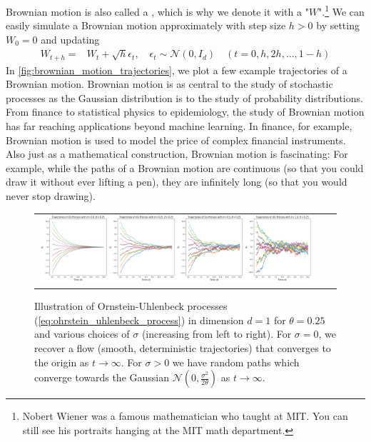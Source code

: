 Brownian motion is also called a , which is why we denote it with a "$W$".\footnote{Nobert Wiener was a famous mathematician who taught at MIT. You can still see his portraits hanging at the MIT math department.} We can easily simulate a Brownian motion approximately with step size $h>0$ by setting $W_0=0$ and updating
\begin{align}
    \label{eq:brownian_motion_simulation}
    W_{t+h} =& W_{t} + \sqrt{h}\epsilon_t,\quad \epsilon_t\sim\mathcal{N}(0,I_d)\quad (t=0,h,2h,\dots,1-h)
\end{align}
In \cref{fig:brownian_motion_trajectories}, we plot a few example trajectories of a Brownian motion.  Brownian motion is as central to the study of stochastic processes as the Gaussian distribution is to the study of probability distributions. From finance to statistical physics to epidemiology, the study of Brownian motion has far reaching applications beyond  machine learning. In finance, for example, Brownian motion is used to model the price of complex financial instruments. Also just as a mathematical construction, Brownian motion is fascinating: For example, while the paths of a Brownian motion are continuous (so that you could draw it without ever lifting a pen), they are infinitely long (so that you would never stop drawing).

\begin{figure}
    \centering
    \begin{tabular}{ccc}
         \includegraphics[width=\textwidth]{figures/ou_process.png} &
    \end{tabular}
    \caption{\label{fig:bm_ou_process} Illustration of Ornstein-Uhlenbeck processes (\cref{eq:ohrstein_uhlenbeck_process}) in dimension $d=1$ for $\theta=0.25$ and various choices of $\sigma$ (increasing from left to right). For $\sigma=0$, we recover a flow (smooth, deterministic trajectories) that converges to the origin as $t \to \infty$. For $\sigma>0$ we have random paths which converge towards the Gaussian $\mathcal{N}(0,\frac{\sigma^2}{2\theta})$ as $t\to\infty$.}
\end{figure} 


